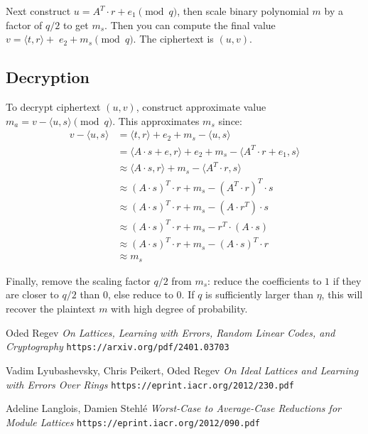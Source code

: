 \documentclass{article}
\begin{document}
Next construct $u = A^T \cdot r + e_1 \pmod{q}$, then scale binary polynomial $m$ by a factor of $q/2$ to get $m_s$.  Then you can compute the final value $v = \langle t, r \rangle +\;e_2 + m_s \pmod{q}$.  The ciphertext is $(u, v)$.

\subsection{
  Decryption
}

To decrypt ciphertext $(u, v)$, construct approximate value $m_a = v - \langle u, s \rangle \pmod{q}$.  This approximates $m_s$ since:
\begin{align}
  v - \langle u, s \rangle &= \langle t, r \rangle + e_2 + m_s - \langle u, s \rangle\nonumber\\
  &= \langle A \cdot s + e, r \rangle + e_2 + m_s - \langle A^T \cdot r + e_1, s \rangle\nonumber\\
  &\approx \langle A \cdot s, r \rangle + m_s - \langle A^T \cdot r, s \rangle\nonumber\\
  &\approx (A \cdot s)^T \cdot r + m_s - (A^T \cdot r)^T \cdot s\nonumber\\
  &\approx (A \cdot s)^T \cdot r + m_s - (A \cdot r^T) \cdot s\nonumber\\
  &\approx (A \cdot s)^T \cdot r + m_s - r^T \cdot (A \cdot s)\nonumber\\
  &\approx (A \cdot s)^T \cdot r + m_s - (A \cdot s)^T \cdot r\nonumber\\
  &\approx m_s
\end{align}

Finally, remove the scaling factor $q/2$ from $m_s$: reduce the coefficients to $1$ if they are closer to $q/2$ than $0$, else reduce to $0$.  If $q$ is sufficiently larger than $\eta$, this will recover the plaintext $m$ with high degree of probability.


\begin{thebibliography}{3}

  Oded Regev
  \emph{On Lattices, Learning with Errors, Random Linear Codes, and Cryptography}
  \texttt{https://arxiv.org/pdf/2401.03703}

  Vadim Lyubashevsky, Chris Peikert, Oded Regev
  \emph{On Ideal Lattices and Learning with Errors Over Rings}
  \texttt{https://eprint.iacr.org/2012/230.pdf}

  Adeline Langlois, Damien Stehlé
  \emph{Worst-Case to Average-Case Reductions for Module Lattices}
  \texttt{https://eprint.iacr.org/2012/090.pdf}
  
\end{thebibliography}
\end{document}
